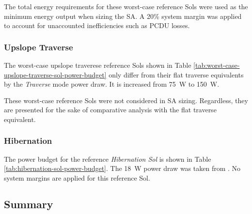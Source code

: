 

The total energy requirements for these worst-case reference Sols were used as the minimum energy output when sizing the \ac{SA}. A 20\% system margin was applied to account for unaccounted inefficiencies such as \ac{PCDU} losses.

\subsubsection{Upslope Traverse}
\label{sec:Design:PowerBudget:TraversePowerBudget:UpslopeTraverse}
The worst-case upslope traverese reference Sols shown in Table \ref{tab:worst-case-upslope-traverse-sol-power-budget} only differ from their flat traverse equivalents by the \textit{Traverse} mode power draw. It is increased from \SI{75}{\watt} to \SI{150}{\watt}.



These worst-case reference Sols were not considered in \ac{SA} sizing. Regardless, they are presented for the sake of comparative analysis with the flat traverse equivalent.


\subsubsection{Hibernation}
\label{sec:Design:PowerBudget:TraversePowerBudget:Hibernation}
The power budget for the reference \textit{Hibernation Sol} is shown in Table \ref{tab:hibernation-sol-power-budget}. The \SI{18}{\watt} power draw was taken from . No system margins are applied for this reference Sol.



\subsection{Summary}
\label{sec:PowerBudget:Summary}
